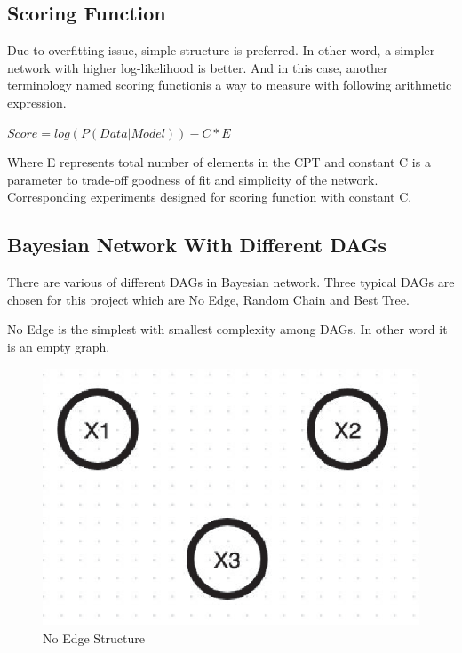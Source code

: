\documentclass{article}
\begin{document}
\subsection{Scoring Function}
Due to overfitting issue, simple structure is preferred. In other word, a simpler network with higher log-likelihood is better. And in this case, another terminology named scoring function\cite{score}is a way to measure with following arithmetic expression. 

$Score = log(P(Data|Model)) - C*E$

Where E represents total number of elements in the CPT and constant C is a parameter to trade-off goodness of fit and simplicity of the network. Corresponding experiments designed for scoring function with constant C.

\subsection{Bayesian Network With Different DAGs}
There are various of different DAGs in Bayesian network. Three typical DAGs are chosen for this project which are No Edge, Random Chain and Best Tree.

No Edge is the simplest with smallest complexity among DAGs. In other word it is an empty graph. 

\begin{figure}[ht]
\vskip 0.2in
\begin{center}
\centerline{\includegraphics[width=\columnwidth]{noEdge}}
\caption{No Edge Structure}
\label{noEdge}
\end{center}
\vskip -0.2in
\end{figure} 
\end{document}
